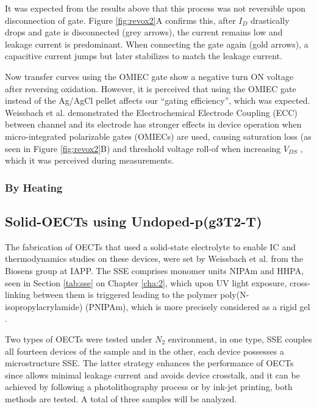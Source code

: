 It was expected from the results above that this process was not reversible upon disconnection of gate. Figure \ref{fig:revox2}A confirms this, after $I_{D}$ drastically drops and gate is disconnected (grey arrows), the current remains low and leakage current is predominant. When connecting the gate again (gold arrows), a capacitive current jumps but later stabilizes to match the leakage current.

Now transfer curves using the OMIEC gate show a negative turn ON voltage after reversing oxidation. However, it is perceived that using the OMIEC gate instead of the Ag/AgCl pellet affects our ``gating efficiency'', which was expected. Weissbach et al. demonstrated the Electrochemical Electrode Coupling (ECC) between channel and its electrode has stronger effects in device operation when micro-integrated polarizable gates (OMIECs) are used, causing saturation loss (as seen in Figure \ref{fig:revox2}B) and threshold voltage roll-of when increasing $V_{DS}$ \cite{weissbachUnravelingElectrochemicalElectrode2023}, which it was perceived during measurements.

\subsubsection{By Heating}


\subsection{Solid-OECTs using Undoped-p(g3T2-T)}
The fabrication of OECTs that used a solid-state electrolyte to enable IC and thermodynamics studies on these devices, were set by Weissbach et al. from the Biosens group at IAPP. The SSE comprises monomer units NIPAm and HHPA, seen in Section \ref{tab:sse} on Chapter \ref{cha:2}, %
which upon UV light exposure, cross-linking between them is triggered leading to the polymer poly(N-isopropylacrylamide) (PNIPAm), which is more precisely considered as a rigid gel \cite{weissbachPhotopatternableSolidElectrolyte2022}. 

Two types of OECTs were tested under $N_{2}$ environment, in one type, SSE couples all fourteen devices of the sample and in the other, each device possesses a microstructure SSE. The latter strategy enhances the performance of OECTs since allows minimal leakage current and avoids device crosstalk, and it can be achieved by following a photolithography process \cite{weissbachPhotopatternableSolidElectrolyte2022} or by ink-jet printing, both methods are tested. A total of three samples will be analyzed. 

